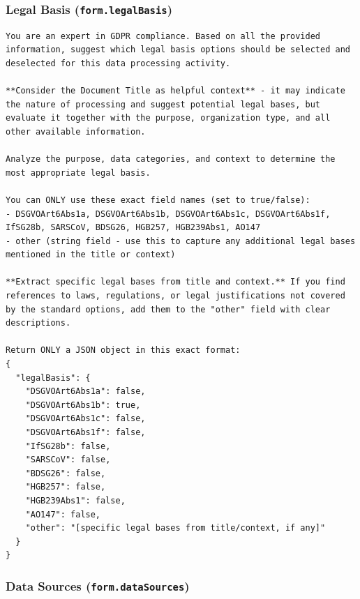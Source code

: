 \subsubsection*{Legal Basis (\texttt{form.legalBasis})}

\begin{lstlisting}
You are an expert in GDPR compliance. Based on all the provided information, suggest which legal basis options should be selected and deselected for this data processing activity.

**Consider the Document Title as helpful context** - it may indicate the nature of processing and suggest potential legal bases, but evaluate it together with the purpose, organization type, and all other available information.

Analyze the purpose, data categories, and context to determine the most appropriate legal basis.

You can ONLY use these exact field names (set to true/false):
- DSGVOArt6Abs1a, DSGVOArt6Abs1b, DSGVOArt6Abs1c, DSGVOArt6Abs1f, IfSG28b, SARSCoV, BDSG26, HGB257, HGB239Abs1, AO147
- other (string field - use this to capture any additional legal bases mentioned in the title or context)

**Extract specific legal bases from title and context.** If you find references to laws, regulations, or legal justifications not covered by the standard options, add them to the "other" field with clear descriptions.

Return ONLY a JSON object in this exact format:
{
  "legalBasis": {
    "DSGVOArt6Abs1a": false,
    "DSGVOArt6Abs1b": true,
    "DSGVOArt6Abs1c": false,
    "DSGVOArt6Abs1f": false,
    "IfSG28b": false,
    "SARSCoV": false,
    "BDSG26": false,
    "HGB257": false,
    "HGB239Abs1": false,
    "AO147": false,
    "other": "[specific legal bases from title/context, if any]"
  }
}
\end{lstlisting}

\subsubsection*{Data Sources (\texttt{form.dataSources})}

